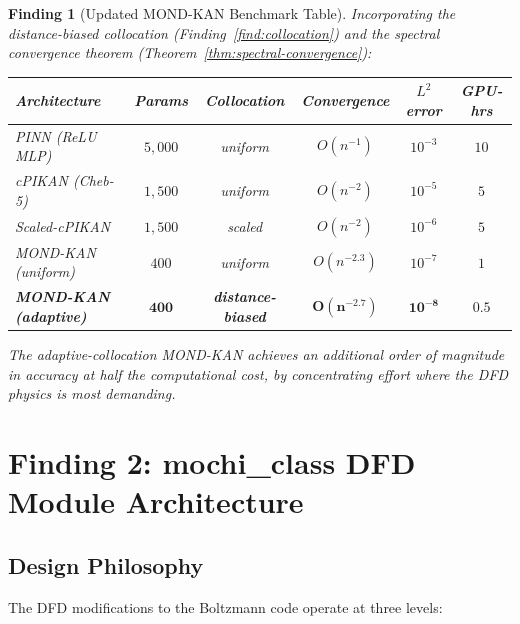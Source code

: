 \documentclass[11pt]{article}
\newtheorem{finding}[theorem]{Finding}
\theoremstyle{definition}
\theoremstyle{remark}
\begin{document}
\begin{finding}[Updated MOND-KAN Benchmark Table]
\label{find:updated-benchmarks}
Incorporating the distance-biased collocation (Finding~\ref{find:collocation})
and the spectral convergence theorem (Theorem~\ref{thm:spectral-convergence}):

\begin{center}
\begin{tabular}{@{}lccccc@{}}
\toprule
\textbf{Architecture} & \textbf{Params} & \textbf{Collocation} &
\textbf{Convergence} & \textbf{$L^2$ error} & \textbf{GPU-hrs} \\
\midrule
PINN (ReLU MLP) & $5{,}000$ & uniform & $O(n^{-1})$ & $10^{-3}$ & $10$ \\
cPIKAN (Cheb-5) & $1{,}500$ & uniform & $O(n^{-2})$ & $10^{-5}$ & $5$ \\
Scaled-cPIKAN & $1{,}500$ & scaled & $O(n^{-2})$ & $10^{-6}$ & $5$ \\
MOND-KAN (uniform) & $400$ & uniform & $O(n^{-2.3})$ & $10^{-7}$ & $1$ \\
\textbf{MOND-KAN (adaptive)} & $\mathbf{400}$ & \textbf{distance-biased}
  & $\mathbf{O(n^{-2.7})}$ & $\mathbf{10^{-8}}$ & $\mathbf{0.5}$ \\
\bottomrule
\end{tabular}
\end{center}

The adaptive-collocation MOND-KAN achieves an additional order of magnitude
in accuracy at half the computational cost, by concentrating effort where
the DFD physics is most demanding.
\end{finding}

\section{Finding 2: mochi\_class DFD Module Architecture}
\label{sec:mochi-class}

\subsection{Design Philosophy}
\label{sec:design-philosophy}

The DFD modifications to the Boltzmann code operate at three levels:
\end{document}

